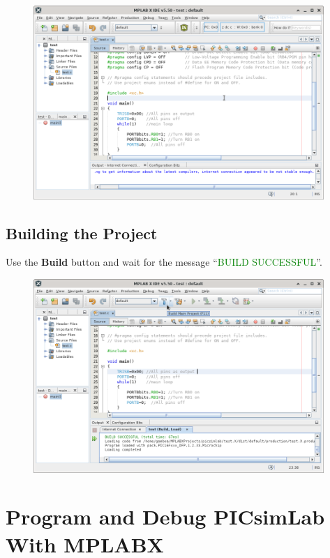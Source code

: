 \begin{figure}[H]
\center
\includegraphics[width=0.98\textwidth]{img/hmd/mplab22.png} 
\end{figure} 

\subsection{Building the Project}

Use the \textbf{Build} button and wait for the message ``\textcolor{green}{BUILD SUCCESSFUL}''.

\begin{figure}[H]
\center
\includegraphics[width=0.98\textwidth]{img/hmd/mplab23.png} 
\end{figure} 



\section{Program and Debug PICsimLab With MPLABX}


